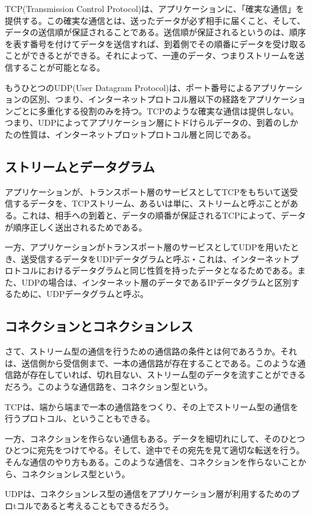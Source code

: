 TCP(Transmission Control Protocol)は、アプリケーションに、「確実な通信」を提供する。この確実な通信とは、送ったデータが必ず相手に届くこと、そして、データの送信順が保証されることである。送信順が保証されるというのは、順序を表す番号を付けてデータを送信すれば、到着側でその順番にデータを受け取ることができるとができる。それによって、一連のデータ、つまりストリームを送信することが可能となる。

もうひとつのUDP(User Datagram Protocol)は、ポート番号によるアプリケーションの区別、つまり、インターネットプロトコル層以下の経路をアプリケーションごとに多重化する役割のみを持つ。TCPのような確実な通信は提供しない。つまり、UDPによってアプリケーション層にトドけらルデータの、到着のしかたの性質は、インターネットプロットプロトコル層と同じである。

\subsection{ストリームとデータグラム}
アプリケーションが、トランスポート層のサービスとしてTCPをもちいて送受信するデータを、TCPストリーム、あるいは単に、ストリームと呼ぶことがある。これは、相手への到着と、データの順番が保証されるTCPによって、データが順序正しく送出されるためである。

一方、アプリケーションがトランスポート層のサービスとしてUDPを用いたとき、送受信するデータをUDPデータグラムと呼ぶ・これは、インターネットプロトコルにおけるデータグラムと同じ性質を持ったデータとなるためである。また、UDPの場合は、インターネット層のデータであるIPデータグラムと区別するために、UDPデータグラムと呼ぶ。

\subsection{コネクションとコネクションレス}
さて、ストリーム型の通信を行うための通信路の条件とは何であろうか。それは、送信側から受信側まで、一本の通信路が存在することである。このような通信路が存在していれば、切れ目ない、ストリーム型のデータを流すことができるだろう。このような通信路を、コネクション型という。

TCPは、端から端まで一本の通信路をつくり、その上でストリーム型の通信を行うプロトコル、ということもできる。

一方、コネクションを作らない通信もある。データを細切れにして、そのひとつひとつに宛先をつけてやる。そして、途中でその宛先を見て適切な転送を行う。そんな通信のやり方もある。このような通信を、コネクションを作らないことから、コネクションレス型という。

UDPは、コネクションレス型の通信をアプリケーション層が利用するためのプロtコルであると考えることもできるだろう。

